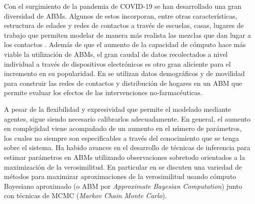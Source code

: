 Con el surgimiento de la pandemia de COVID-19 se han desarrollado una gran diversidad de ABMs. Algunos de estos incorporan, entre otras características, estructura de edades y redes de contactos a través de escuelas, casas, lugares de trabajo que permiten modelar de manera más realista las mezclas que dan lugar a los contactos \citep{Kerr2020,Flaxman2020,Simoy2021}. Además de que el aumento de la capacidad de cómputo hace más viable la utilización de ABMs, el gran caudal de datos recolectados a nivel individual a través de dispositivos electrónicos es otro gran aliciente para el incremento en su popularidad. En \cite{Aleta2020} se utilizan datos demográficos y de movilidad para construir las redes de contactos y distribución de hogares en un ABM que permite evaluar los efectos de las intervenciones no-farmacéuticas.

A pesar de la flexibilidad y expresividad que permite el modelado mediante agentes, sigue siendo necesario calibrarlos adecuadamente. En general, el aumento en complejidad viene acompañado de un aumento en el número de parámetros, los cuales no siempre son especificables a través del conocimiento que se tenga sobre el sistema. Ha habido avances en el desarrollo de técnicas de inferencia para estimar parámetros en ABMs utilizando observaciones sobretodo orientados a la maximización de la verosimilitud. En particular en \cite{Hooten2020} se discuten una variedad de métodos para maximizar aproximaciones de la verosimilitud usando cómputo Bayesiano aproximado (o ABM por \textit{Approximate Bayesian Computation}) junto con técnicas de MCMC (\textit{Markov Chain Monte Carlo}).

